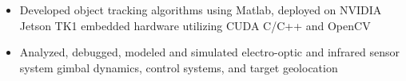 \begin{itemize} [leftmargin = \itemmargin]
	\item Developed object tracking algorithms using Matlab, deployed on NVIDIA Jetson TK1 embedded hardware utilizing CUDA C/C++ and OpenCV
	\item Analyzed, debugged, modeled and simulated electro-optic and infrared sensor system gimbal dynamics, control systems, and target geolocation
\end{itemize} 